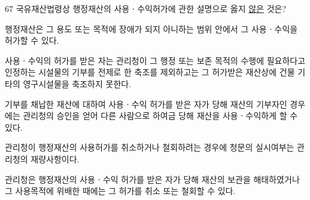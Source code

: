 \begin{question}{67}
국유재산법령상 행정재산의 사용ㆍ수익허가에 관한 설명으로 옳지 \uline{않은} 것은?
\begin{choices}
  \item 행정재산은 그 용도 또는 목적에 장애가 되지 아니하는 범위 안에서 그 사용ㆍ수익을 허가할 수 있다.
  \item 사용ㆍ수익의 허가를 받은 자는 관리청이 그 행정 또는 보존 목적의 수행에 필요하다고 인정하는 시설물의 기부를 전제로 한 축조를 제외하고는 그 허가받은 재산상에 건물 기타의 영구시설물을 축조하지 못한다.
  \item 기부를 채납한 재산에 대하여 사용ㆍ수익 허가를 받은 자가 당해 재산의 기부자인 경우에는 관리청의 승인을 얻어 다른 사람으로 하여금 당해 재산을 사용ㆍ수익하게 할 수 있다.
  \item 관리청이 행정재산의 사용허가를 취소하거나 철회하려는 경우에 청문의 실시여부는 관리청의 재량사항이다.
  \item 관리청은 행정재산의 사용ㆍ수익 허가를 받은 자가 당해 재산의 보관을 해태하였거나 그 사용목적에 위배한 때에는 그 허가를 취소 또는 철회할 수 있다.
\end{choices}
\end{question}
